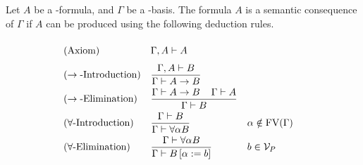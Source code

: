 \begin{definition}
Let $A$ be a \SysP-formula, and $\Gamma$ be a \SysP-basis. The formula $A$ is a semantic consequence of $\Gamma$ if $A$ can be produced using the following deduction rules.
\begin{mdframed}
	\begingroup%
	\addtolength{\jot}{0.3cm}
	\begin{align*}
		&(\text{Axiom}) &&\Gamma,A\PModels A\vphantom{\frac{\Gamma}{\Gamma}}\\
		&(\rightarrow\text{-Introduction}) &&\frac{\Gamma,A\PModels B}{\Gamma\PModels A\to B}\\
		&(\rightarrow\text{-Elimination}) &&\frac{\Gamma\PModels A\to B \hspace{0.4cm}\Gamma\PModels A}{\Gamma\PModels B}\\
		  & (\forall\text{-Introduction}) &   & \frac{\Gamma\PModels B}{\Gamma\PModels \forall\alpha B} &   & \alpha\notin\FV(\Gamma) \\
		&(\forall\text{-Elimination}) &&\frac{\Gamma\PModels \forall\alpha B }{\Gamma\PModels B\left[ \alpha:=b\right] }
		&& b\in\VarP %
	\end{align*}
	\endgroup
\end{mdframed}
\end{definition}

